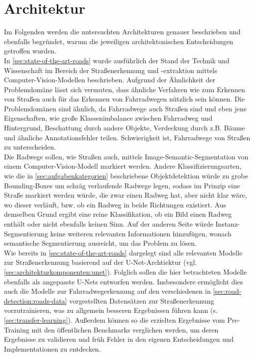 \section{Architektur} \label{sec:architecture}

Im Folgenden werden die untersuchten Architekturen genauer beschrieben und ebenfalls begründet, 
warum die jeweiligen architektonischen Entscheidungen getroffen wurden. \\
In \autoref{sec:state-of-the-art-roads} wurde ausführlich der Stand der Technik und Wissenschaft 
im Bereich der Straßenerkennung und -extraktion mittels Computer-Vision-Modellen beschrieben. 
Aufgrund der Ähnlichkeit der Problemdomäne lässt sich vermuten, dass ähnliche Verfahren wie 
zum Erkennen von Straßen auch für das Erkennen von Fahrradwegen nützlich sein können. 
Die Problemdomänen sind ähnlich, da Fahrradwege auch Straßen sind und eben jene Eigenschaften, 
wie große Klassenimbalance zwischen Fahrradweg und Hintergrund, Beschattung durch andere Objekte,
Verdeckung durch z.B. Bäume und ähnliche Annotationsfehler   
teilen. Schwierigkeit ist, Fahrradwege von Straßen zu unterscheiden. \\
Die Radwege sollen, wie Straßen auch, mittels Image-Semantic-Segmentation von einem Computer-Vision-Modell 
markiert werden. Andere Klassifizierungsarten, wie die in \autoref{sec:aufgabenkategorien} beschriebene 
Objektdetektion würde zu grobe Bounding-Boxes um schräg verlaufende Radwege legen, sodass im Prinzip 
eine Straße markiert werden würde, die zwar einen Radweg hat, aber nicht klar wäre, wo dieser verläuft, 
bzw. ob ein Radweg in beide Richtungen existiert. Aus demselben Grund ergibt eine reine Klassifikation, 
ob ein Bild einen Radweg enthält oder nicht ebenfalls keinen Sinn. 
Auf der anderen Seite würde Instanz-Segmentierung keine weiteren relevanten Informationen hinzufügen, 
wonach semantische Segmentierung ausreicht, um das Problem zu lösen. \\
Wie bereits in \autoref{sec:state-of-the-art-roads} dargelegt sind alle relevanten Modelle zur 
Straßenerkennung basierend auf der U-Net-Archtiektur (vgl. \ref{sec:architekturkomponenten:unet}).
Folglich sollen die hier betrachteten Modelle ebenfalls als angepasste U-Nets entworfen werden. 
Insbesondere ermöglicht dies auch die Modelle zur Fahrradwegerkennung auf den verschiedenen 
in \autoref{sec:road-detection:roads-data} vorgestellten Datensätzen zur Straßenerkennung vorzutrainieren, 
was zu allgemein besseren Ergebnissen führen kann (s. \autoref{sec:transfer-learning}). 
Außerdem können so die erzielten Ergebnisse vom Pre-Training mit den öffentlichen Benchmarks verglichen werden,
um deren Ergebnisse zu validieren und früh Fehler in den eigenen Entscheidungen und Implementationen zu entdecken.

